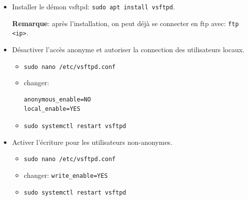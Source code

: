 \documentclass[a4paper]{article}
\begin{document}
\begin{itemize}

\item Installer le démon vsftpd: \texttt{sudo apt install vsftpd}.
\begin{example}
    \textbf{Remarque}: après l'installation, on peut déjà se connecter en ftp avec: \texttt{ftp <ip>}.
\end{example}

\item Désactiver l'accès anonyme et autoriser la connection des utilisateurs locaux.
\begin{example}
    \begin{itemize}
        \item \texttt{sudo nano /etc/vsftpd.conf}
        \item changer:
        \begin{verbatim}
anonymous_enable=NO
local_enable=YES
        \end{verbatim}
        \item \texttt{sudo systemctl restart vsftpd}
    \end{itemize}
\end{example}

\item Activer l'écriture pour les utilisateurs non-anonymes.
\begin{example}
    \begin{itemize}
        \item \texttt{sudo nano /etc/vsftpd.conf}
        \item changer: \texttt{write\_enable=YES}
        \item \texttt{sudo systemctl restart vsftpd}
    \end{itemize}
\end{example}


\end{itemize}
\end{document}
